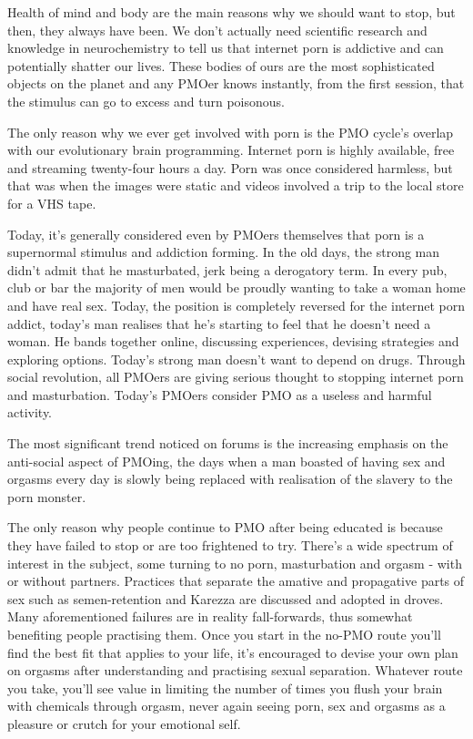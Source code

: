 \documentclass[easypeasy.tex]{subfiles}
\begin{document}
Health of mind and body are the main reasons why we should want to stop, but then, they always have been. We don't actually need scientific research and knowledge in neurochemistry to tell us that internet porn is addictive and can potentially shatter our lives. These bodies of ours are the most sophisticated objects on the planet and any PMOer knows instantly, from the first session, that the stimulus can go to excess and turn poisonous.

The only reason why we ever get involved with porn is the PMO cycle's overlap with our evolutionary brain programming. Internet porn is highly available, free and streaming twenty-four hours a day. Porn was once considered harmless, but that was when the images were static and videos involved a trip to the local store for a VHS tape.

Today, it's generally considered even by PMOers themselves that porn is a supernormal stimulus and addiction forming. In the old days, the strong man didn't admit that he masturbated, jerk being a derogatory term. In every pub, club or bar the majority of men would be proudly wanting to take a woman home and have real sex. Today, the position is completely reversed for the internet porn addict, today's man realises that he's starting to feel that he doesn't need a woman. He bands together online, discussing experiences, devising strategies and exploring options. Today's strong man doesn't want to depend on drugs. Through social revolution, all PMOers are giving serious thought to stopping internet porn and masturbation. Today's PMOers consider PMO as a useless and harmful activity.

The most significant trend noticed on forums is the increasing emphasis on the anti-social aspect of PMOing, the days when a man boasted of having sex and orgasms every day is slowly being replaced with realisation of the slavery to the porn monster.

The only reason why people continue to PMO after being educated is because they have failed to stop or are too frightened to try. There's a wide spectrum of interest in the subject, some turning to no porn, masturbation and orgasm - with or without partners. Practices that separate the amative and propagative parts of sex such as semen-retention and Karezza are discussed and adopted in droves. Many aforementioned failures are in reality fall-forwards, thus somewhat benefiting people practising them. Once you start in the no-PMO route you'll find the best fit that applies to your life, it's encouraged to devise your own plan on orgasms after understanding and practising sexual separation. Whatever route you take, you'll see value in limiting the number of times you flush your brain with chemicals through orgasm, never again seeing porn, sex and orgasms as a pleasure or crutch for your emotional self.
\end{document}
